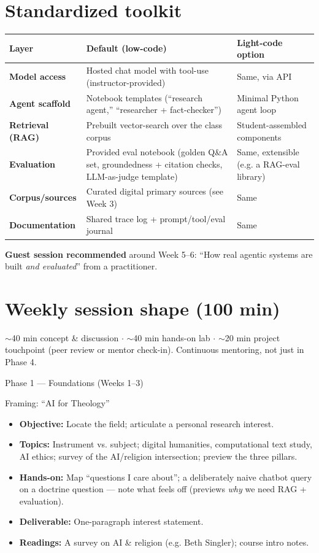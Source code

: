 \documentclass[11pt]{article}
\newcommand{\phase}[1]{%
  \vspace{0.8em}
  \noindent\colorbox{primary}{\parbox{\dimexpr\textwidth-2\fboxsep}{%
    \color{white}\bfseries\large\strut #1}}\par\vspace{0.5em}}
\newenvironment{week}[2]{%
  \vspace{0.4em}
  \noindent{\color{primary}\bfseries #1}\; #2\par\nobreak
  \begin{itemize}[leftmargin=1.4em,itemsep=1pt,topsep=2pt]}%
  {\end{itemize}}
\begin{document}
\section{Standardized toolkit}
\begin{tabularx}{\textwidth}{@{}>{\bfseries}l Y Y@{}}
\toprule
\normalfont\textbf{Layer} & \textbf{Default (low-code)} & \textbf{Light-code option} \\
\midrule
Model access & Hosted chat model with tool-use (instructor-provided) & Same, via API \\
Agent scaffold & Notebook templates (``research agent,'' ``researcher + fact-checker'') & Minimal Python agent loop \\
Retrieval (RAG) & Prebuilt vector-search over the class corpus & Student-assembled components \\
\textbf{Evaluation} & Provided eval notebook (golden Q\&A set, groundedness + citation checks, LLM-as-judge template) & Same, extensible (e.g. a RAG-eval library) \\
Corpus/sources & Curated digital primary sources (see Week 3) & Same \\
Documentation & Shared trace log + prompt/tool/eval journal & Same \\
\bottomrule
\end{tabularx}

\begin{tcolorbox}[colback=light,colframe=accent,boxrule=0.5pt,arc=2pt,left=8pt,right=8pt,top=5pt,bottom=5pt]
\small\textbf{Guest session recommended} around Week 5--6: ``How real agentic systems are built
\emph{and evaluated}'' from a practitioner.
\end{tcolorbox}

\section{Weekly session shape (100 min)}
$\sim$40 min concept \& discussion $\cdot$ $\sim$40 min hands-on lab $\cdot$ $\sim$20 min project touchpoint
(peer review or mentor check-in). Continuous mentoring, not just in Phase 4.

\phase{Phase 1 --- Foundations (Weeks 1--3)}

\begin{week}{Week 1}{Framing: ``AI for Theology''}
  \item \textbf{Objective:} Locate the field; articulate a personal research interest.
  \item \textbf{Topics:} Instrument vs. subject; digital humanities, computational text study, AI ethics;
    survey of the AI/religion intersection; preview the three pillars.
  \item \textbf{Hands-on:} Map ``questions I care about''; a deliberately naive chatbot query on a doctrine
    question --- note what feels off (previews \emph{why} we need RAG + evaluation).
  \item \textbf{Deliverable:} One-paragraph interest statement.
  \item \textbf{Readings:} A survey on AI \& religion (e.g. Beth Singler); course intro notes.
\end{week}
\end{document}
